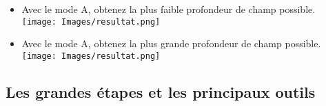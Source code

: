 \documentclass[10pt,fleqn]{article} %
\begin{document}
\begin{itemize}
\item Avec le mode A, obtenez la plus faible profondeur de champ possible.
\\ \texttt{[image: Images/resultat.png]}
\item Avec le mode A, obtenez la plus grande profondeur de champ possible.
\\ \texttt{[image: Images/resultat.png]}
\end{itemize}




\subsection{Les grandes étapes et les principaux outils}
\end{document}
